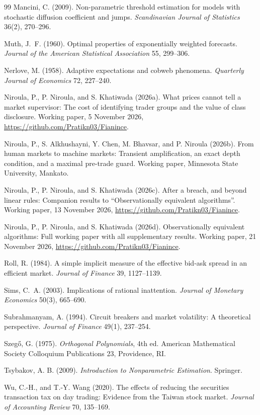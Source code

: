 \documentclass[12pt]{article}
\theoremstyle{definition}
\theoremstyle{remark}
\begin{document}
\begin{thebibliography}{99}
 Mancini, C. (2009). Non-parametric threshold estimation for models with stochastic diffusion coefficient and jumps. \emph{Scandinavian Journal of Statistics} 36(2), 270--296.

 Muth, J.~F. (1960). Optimal properties of exponentially weighted forecasts. \emph{Journal of the American Statistical Association} 55, 299--306.

 Nerlove, M. (1958). Adaptive expectations and cobweb phenomena. \emph{Quarterly Journal of Economics} 72, 227--240.

 Niroula, P., P. Niroula, and S. Khatiwada (2026a). What prices cannot tell a market supervisor: The cost of identifying trader groups and the value of class disclosure. Working paper, 5 November 2026, \url{https://github.com/Pratikn03/Fianince}.

 Niroula, P., S. Alkhushayni, Y. Chen, M. Bhavsar, and P. Niroula (2026b). From human markets to machine markets: Transient amplification, an exact depth condition, and a maximal pre-trade guard. Working paper, Minnesota State University, Mankato.

 Niroula, P., P. Niroula, and S. Khatiwada (2026c). After a breach, and beyond linear rules: Companion results to ``Observationally equivalent algorithms''. Working paper, 13 November 2026, \url{https://github.com/Pratikn03/Fianince}.

 Niroula, P., P. Niroula, and S. Khatiwada (2026d). Observationally equivalent algorithms: Full working paper with all supplementary results. Working paper, 21 November 2026, \url{https://github.com/Pratikn03/Fianince}.

 Roll, R. (1984). A simple implicit measure of the effective bid-ask spread in an efficient market. \emph{Journal of Finance} 39, 1127--1139.

 Sims, C.~A. (2003). Implications of rational inattention. \emph{Journal of Monetary Economics} 50(3), 665--690.

 Subrahmanyam, A. (1994). Circuit breakers and market volatility: A theoretical perspective. \emph{Journal of Finance} 49(1), 237--254.

 Szeg\H{o}, G. (1975). \emph{Orthogonal Polynomials}, 4th ed. American Mathematical Society Colloquium Publications 23, Providence, RI.

 Tsybakov, A. B. (2009). \emph{Introduction to Nonparametric Estimation}. Springer.

 Wu, C.-H., and T.-Y. Wang (2020). The effects of reducing the securities transaction tax on day trading: Evidence from the Taiwan stock market. \emph{Journal of Accounting Review} 70, 135--169.
\end{thebibliography}
\end{document}
